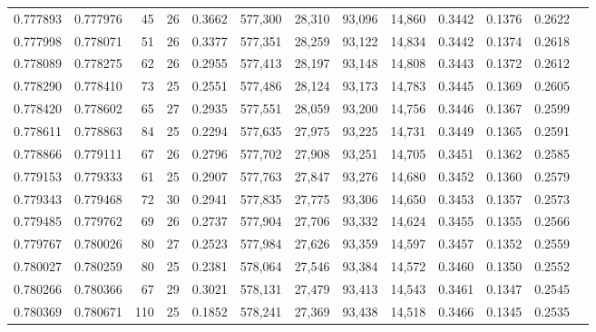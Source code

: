 \begin{tabular}{rrrrrrrrrrrrr}
0.777893 & 0.777976 &    45 &  26 &                                     0.3662 & 577,300 &  28,310 &  93,096 &  14,860 & 0.3442 & 0.1376 & 0.2622 \\
0.777998 & 0.778071 &    51 &  26 &                                     0.3377 & 577,351 &  28,259 &  93,122 &  14,834 & 0.3442 & 0.1374 & 0.2618 \\
0.778089 & 0.778275 &    62 &  26 &                                     0.2955 & 577,413 &  28,197 &  93,148 &  14,808 & 0.3443 & 0.1372 & 0.2612 \\
0.778290 & 0.778410 &    73 &  25 &                                     0.2551 & 577,486 &  28,124 &  93,173 &  14,783 & 0.3445 & 0.1369 & 0.2605 \\
0.778420 & 0.778602 &    65 &  27 &                                     0.2935 & 577,551 &  28,059 &  93,200 &  14,756 & 0.3446 & 0.1367 & 0.2599 \\
0.778611 & 0.778863 &    84 &  25 &                                     0.2294 & 577,635 &  27,975 &  93,225 &  14,731 & 0.3449 & 0.1365 & 0.2591 \\
0.778866 & 0.779111 &    67 &  26 &                                     0.2796 & 577,702 &  27,908 &  93,251 &  14,705 & 0.3451 & 0.1362 & 0.2585 \\
0.779153 & 0.779333 &    61 &  25 &                                     0.2907 & 577,763 &  27,847 &  93,276 &  14,680 & 0.3452 & 0.1360 & 0.2579 \\
0.779343 & 0.779468 &    72 &  30 &                                     0.2941 & 577,835 &  27,775 &  93,306 &  14,650 & 0.3453 & 0.1357 & 0.2573 \\
0.779485 & 0.779762 &    69 &  26 &                                     0.2737 & 577,904 &  27,706 &  93,332 &  14,624 & 0.3455 & 0.1355 & 0.2566 \\
0.779767 & 0.780026 &    80 &  27 &                                     0.2523 & 577,984 &  27,626 &  93,359 &  14,597 & 0.3457 & 0.1352 & 0.2559 \\
0.780027 & 0.780259 &    80 &  25 &                                     0.2381 & 578,064 &  27,546 &  93,384 &  14,572 & 0.3460 & 0.1350 & 0.2552 \\
0.780266 & 0.780366 &    67 &  29 &                                     0.3021 & 578,131 &  27,479 &  93,413 &  14,543 & 0.3461 & 0.1347 & 0.2545 \\
0.780369 & 0.780671 &   110 &  25 &                                     0.1852 & 578,241 &  27,369 &  93,438 &  14,518 & 0.3466 & 0.1345 & 0.2535 \\

\end{tabular}
